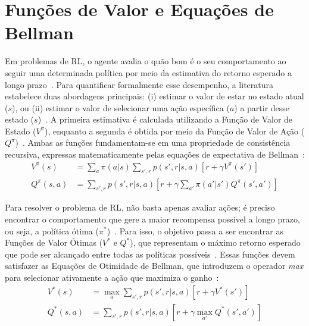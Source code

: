 \section*{Funções de Valor e Equações de Bellman}

Em problemas de \gls{RL}, o agente avalia o quão bom é o seu comportamento ao seguir uma determinada política por meio da estimativa do retorno esperado a longo prazo~\cite{sutton2018}. Para quantificar formalmente esse desempenho, a literatura estabelece duas abordagens principais: (i) estimar o valor de estar no estado atual ($s$), ou (ii) estimar o valor de selecionar uma ação específica ($a$) a partir desse estado ($s$)~\cite{hu2024, sutton2018}. A primeira estimativa é calculada utilizando a Função de Valor de Estado ($V^\pi$), enquanto a segunda é obtida por meio da Função de Valor de Ação ($Q^\pi$)~\cite{hu2024, sutton2018}. Ambas as funções fundamentam-se em uma propriedade de consistência recursiva, expressas matematicamente pelas equações de expectativa de Bellman~\cite{sutton2018}:
\begin{align} 
V^\pi(s) &= \sum_{a} \pi(a|s) \sum_{s', r} p(s',r|s,a) \left[ r + \gamma V^\pi(s') \right] \\
Q^\pi(s,a) &= \sum_{s', r} p(s',r|s,a) \left[ r + \gamma \sum_{a'} \pi(a'|s') Q^\pi(s',a') \right] 
\end{align}

Para resolver o problema de \gls{RL}, não basta apenas avaliar ações; é preciso encontrar o comportamento que gere a maior recompensa possível a longo prazo, ou seja, a política ótima ($\pi^*$)~\cite{hu2024, sutton2018}. Para isso, o objetivo passa a ser encontrar as Funções de Valor Ótimas ($V^*$ e $Q^*$), que representam o máximo retorno esperado que pode ser alcançado entre todas as políticas possíveis~\cite{hu2024, sutton2018}. Essas funções devem satisfazer as Equações de Otimidade de Bellman, que introduzem o operador \textit{max} para selecionar ativamente a ação que maximiza o ganho~\cite{sutton2018, hu2024}: 
\begin{align} 
V^*(s) &= \max_{a} \sum_{s', r} p(s',r|s,a) \left[ r + \gamma V^*(s') \right] \\
Q^*(s,a) &= \sum_{s', r} p(s',r|s,a) \left[ r + \gamma \max_{a'} Q^*(s',a') \right] 
\end{align}

